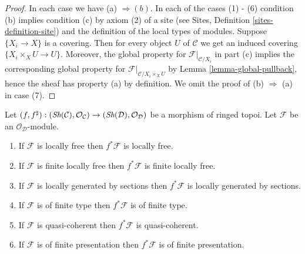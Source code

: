 \begin{proof}
In each case we have (a) $\Rightarrow (b)$. In each of the cases (1) - (6)
condition (b) implies condition (c) by axiom (2) of a site
(see Sites, Definition \ref{sites-definition-site})
and the definition of the local types of modules.
Suppose $\{X_i \to X\}$ is a covering.
Then for every object $U$ of $\mathcal{C}$ we get an
induced covering $\{X_i \times_X U \to U\}$. Moreover, the global
property for $\mathcal{F}|_{\mathcal{C}/X_i}$ in part (c) implies
the corresponding global property for
$\mathcal{F}|_{\mathcal{C}/X_i \times_X U}$ by
Lemma \ref{lemma-global-pullback}, hence the sheaf has property (a)
by definition. We omit the proof of (b) $\Rightarrow$ (a) in case (7).
\end{proof}

\begin{lemma}
\label{lemma-local-pullback}
Let
$(f, f^\sharp) :
(\mathop{\textit{Sh}}\nolimits(\mathcal{C}), \mathcal{O}_\mathcal{C})
\to
(\mathop{\textit{Sh}}\nolimits(\mathcal{D}), \mathcal{O}_\mathcal{D})$
be a morphism of ringed topoi.
Let $\mathcal{F}$ be an $\mathcal{O}_\mathcal{D}$-module.
\begin{enumerate}
\item If $\mathcal{F}$ is locally free then $f^*\mathcal{F}$ is locally free.
\item If $\mathcal{F}$ is finite locally free then $f^*\mathcal{F}$ is
finite locally free.
\item If $\mathcal{F}$ is locally generated by sections
then $f^*\mathcal{F}$ is locally generated by sections.
\item If $\mathcal{F}$ is of finite type
then $f^*\mathcal{F}$ is of finite type.
\item If $\mathcal{F}$ is quasi-coherent then
$f^*\mathcal{F}$ is quasi-coherent.
\item If $\mathcal{F}$ is of finite presentation
then $f^*\mathcal{F}$ is of finite presentation.
\end{enumerate}
\end{lemma}

